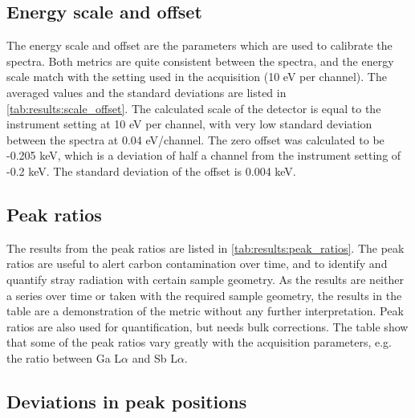 


\subsection*{Energy scale and offset}
\label{results:setup:scale_offset}

The energy scale and offset are the parameters which are used to calibrate the spectra.
Both metrics are quite consistent between the spectra, and the energy scale match with the setting used in the acquisition (10 eV per channel).
The averaged values and the standard deviations are listed in \cref{tab:results:scale_offset}.
The calculated scale of the detector is equal to the instrument setting at 10 eV per channel, with very low standard deviation between the spectra at 0.04 eV/channel.
The zero offset was calculated to be -0.205 keV, which is a deviation of half a channel from the instrument setting of -0.2 keV.
The standard deviation of the offset is 0.004 keV.






\subsection*{Peak ratios}
\label{results:setup:peak_ratios}

The results from the peak ratios are listed in \cref{tab:results:peak_ratios}.
The peak ratios are useful to alert carbon contamination over time, and to identify and quantify stray radiation with certain sample geometry.
As the results are neither a series over time or taken with the required sample geometry, the results in the table are a demonstration of the metric without any further interpretation.
Peak ratios are also used for quantification, but needs bulk corrections. 
The table show that some of the peak ratios vary greatly with the acquisition parameters, e.g. the ratio between Ga L$\alpha$ and Sb L$\alpha$. 








\subsection*{Deviations in peak positions}
\label{results:setup:peak_positions}

